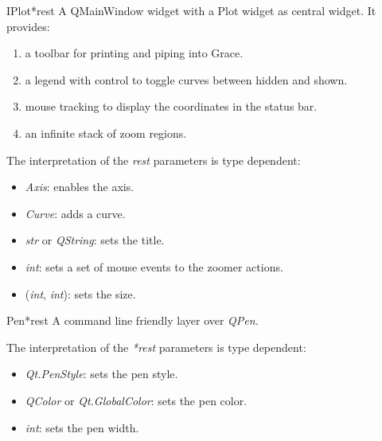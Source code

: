 \documentclass[a4paper,10pt,english]{manual}
\begin{document}
\hypertarget{PyQt4.Qwt5.qplt.IPlot}{}\begin{classdesc}{IPlot}{*rest}
A QMainWindow widget with a Plot widget as central widget. It provides:
\begin{enumerate}
\item {} 
a toolbar for printing and piping into Grace.

\item {} 
a legend with control to toggle curves between hidden and shown.

\item {} 
mouse tracking to display the coordinates in the status bar.

\item {} 
an infinite stack of zoom regions.

\end{enumerate}

The interpretation of the \emph{rest} parameters is type dependent:
\begin{itemize}
\item {} 
\emph{Axis}: enables the axis.

\item {} 
\emph{Curve}: adds a curve.

\item {} 
\emph{str} or \emph{QString}: sets the title.

\item {} 
\emph{int}: sets a set of mouse events to the zoomer actions.

\item {} 
(\emph{int}, \emph{int}): sets the size.

\end{itemize}
\end{classdesc}

\hypertarget{PyQt4.Qwt5.qplt.Pen}{}\begin{classdesc}{Pen}{*rest}
A command line friendly layer over \emph{QPen}.

The interpretation of the \emph{*rest} parameters is type dependent:
\begin{itemize}
\item {} 
\emph{Qt.PenStyle}: sets the pen style.

\item {} 
\emph{QColor} or \emph{Qt.GlobalColor}: sets the pen color.

\item {} 
\emph{int}: sets the pen width.

\end{itemize}
\end{classdesc}
\end{document}
